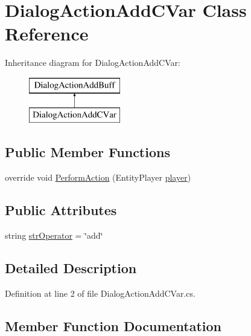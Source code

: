 \hypertarget{class_dialog_action_add_c_var}{}\section{Dialog\+Action\+Add\+C\+Var Class Reference}
\label{class_dialog_action_add_c_var}
Inheritance diagram for Dialog\+Action\+Add\+C\+Var\+:\begin{figure}[H]
\begin{center}
\leavevmode
\includegraphics[height=2.000000cm]{d8/dd5/class_dialog_action_add_c_var}
\end{center}
\end{figure}
\subsection*{Public Member Functions}
\begin{DoxyCompactItemize}
\item 
override void \mbox{\hyperlink{class_dialog_action_add_c_var_a9b0afc913342c5e38f7a33a22bca54ed}{Perform\+Action}} (Entity\+Player \mbox{\hyperlink{_sphere_i_i_01_music_01_boxes_2_config_2_localization_8txt_a4e2cb8aeff651600ea1cc57fe5a929a4}{player}})
\end{DoxyCompactItemize}
\subsection*{Public Attributes}
\begin{DoxyCompactItemize}
\item 
string \mbox{\hyperlink{class_dialog_action_add_c_var_a7f9165f525e4976db76ef899772a0bf9}{str\+Operator}} = \char`\"{}add\char`\"{}
\end{DoxyCompactItemize}


\subsection{Detailed Description}


Definition at line 2 of file Dialog\+Action\+Add\+C\+Var.\+cs.



\subsection{Member Function Documentation}
\mbox{\label{class_dialog_action_add_c_var_a9b0afc913342c5e38f7a33a22bca54ed}} 
